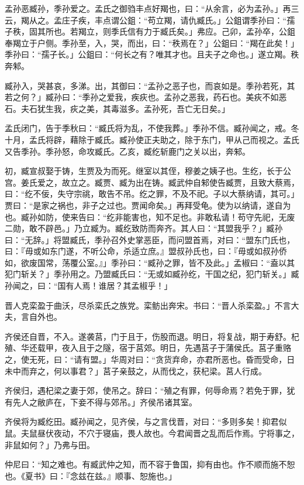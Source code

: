 \documentclass[]{article}
\begin{document}
孟孙恶臧孙，季孙爱之。孟氏之御驺丰点好羯也，曰：``从余言，必为孟孙。」再三云，羯从之。孟庄子疾，丰点谓公鉏：``苟立羯，请仇臧氏。」公鉏谓季孙曰：``孺子秩，固其所也。若羯立，则季氏信有力于臧氏矣。」弗应。己卯，孟孙卒，公鉏奉羯立于户侧。季孙至，入，哭，而出，曰：``秩焉在？」公鉏曰：``羯在此矣！」季孙曰：``孺子长。」公鉏曰：``何长之有？唯其才也。且夫子之命也。」遂立羯。秩奔邾。

臧孙入，哭甚哀，多涕。出，其御曰：``孟孙之恶子也，而哀如是。季孙若死，其若之何？」臧孙曰：``季孙之爱我，疾疢也。孟孙之恶我，药石也。美疢不如恶石。夫石犹生我，疢之美，其毒滋多。孟孙死，吾亡无日矣。」

孟氏闭门，告于季秋曰：``臧氏将为乱，不使我葬。」季孙不信。臧孙闻之，戒。冬十月，孟氏将辟，藉除于臧氏。臧孙使正夫助之，除于东门，甲从己而视之。孟氏又告季孙。季孙怒，命攻臧氏。乙亥，臧纥斩鹿门之关以出，奔邾。

初，臧宣叔娶于铸，生贾及为而死。继室以其侄，穆姜之姨子也。生纥，长于公宫。姜氏爱之，故立之。臧贾、臧为出在铸。臧武仲自邾使告臧贾，且致大蔡焉，曰：``纥不佞，失守宗祧，敢告不吊。纥之罪，不及不祀。子以大蔡纳请，其可。」贾曰：``是家之祸也，非子之过也。贾闻命矣。」再拜受龟。使为以纳请，遂自为也。臧孙如防，使来告曰：``纥非能害也，知不足也。非敢私请！苟守先祀，无废二勋，敢不辟邑。」乃立臧为。臧纥致防而奔齐。其人曰：``其盟我乎？」臧孙曰：``无辞。」将盟臧氏，季孙召外史掌恶臣，而问盟首焉，对曰：``盟东门氏也，曰：『毋或如东门遂，不听公命，杀适立庶。』盟叔孙氏也，曰：『毋或如叔孙侨如，欲废国常，荡覆公室。』」季孙曰：``臧孙之罪，皆不及此。」孟椒曰：``盍以其犯门斩关？」季孙用之。乃盟臧氏曰：``无或如臧孙纥，干国之纪，犯门斩关。」臧孙闻之，曰：``国有人焉！谁居？其孟椒乎！」

晋人克栾盈于曲沃，尽杀栾氏之族党。栾鲂出奔宋。书曰：``晋人杀栾盈。」不言大夫，言自外也。

齐侯还自晋，不入。遂袭莒，门于且于，伤股而退。明日，将复战，期于寿舒。杞殖、华还载甲，夜入且于之隧，宿于莒郊。明日，先遇莒子于蒲侯氏。莒子重赂之，使无死，曰：``请有盟。」华周对曰：``贪货弃命，亦君所恶也。昏而受命，日未中而弃之，何以事君？」莒子亲鼓之，从而伐之，获杞梁。莒人行成。

齐侯归，遇杞梁之妻于郊，使吊之。辞曰：``殖之有罪，何辱命焉？若免于罪，犹有先人之敝庐在，下妾不得与郊吊。」齐侯吊诸其室。

齐侯将为臧纥田。臧孙闻之，见齐侯，与之言伐晋，对曰：``多则多矣！抑君似鼠。夫鼠昼伏夜动，不穴于寝庙，畏人故也。今君闻晋之乱而后作焉。宁将事之，非鼠如何？」乃弗与田。

仲尼曰：``知之难也。有臧武仲之知，而不容于鲁国，抑有由也。作不顺而施不恕也。《夏书》曰：『念兹在兹。』顺事、恕施也。」
\end{document}
